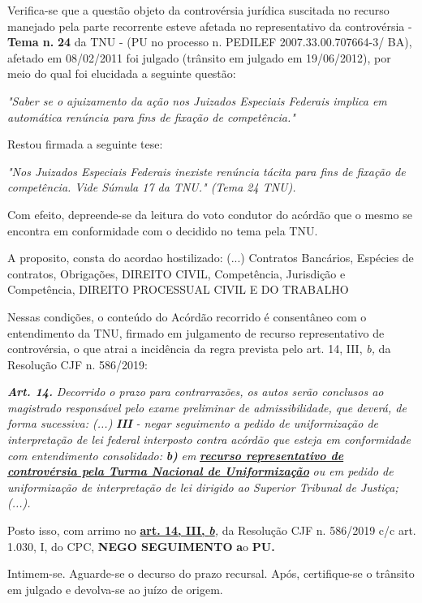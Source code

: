 \documentclass[12pt]{article}
\begin{document}
\justifying
\noindent Verifica-se que a questão objeto da controvérsia jurídica suscitada no recurso manejado pela parte recorrente esteve afetada no representativo da controvérsia - \textbf{Tema n. }\textbf{24} da TNU - (PU no processo n. PEDILEF 2007.33.00.707664-3/ BA),  afetado em 08/02/2011 foi julgado (trânsito em julgado em 19/06/2012), por meio do qual foi elucidada a seguinte questão:

\noindent \textit{"Saber se o ajuizamento da ação nos Juizados Especiais Federais implica em automática renúncia para fins de fixação de competência."}

\noindent Restou firmada a seguinte tese:

\noindent \textit{"Nos Juizados Especiais Federais inexiste renúncia tácita para fins de fixação de competência. Vide Súmula 17 da TNU." (Tema 24 TNU).}

\noindent Com efeito, depreende-se da leitura do voto condutor do acórdão que o mesmo se encontra em conformidade com o decidido no  tema pela TNU.

\noindent A proposito, consta do acordao hostilizado: (...) Contratos Bancários, Espécies de contratos, Obrigações, DIREITO CIVIL, Competência, Jurisdição e Competência, DIREITO PROCESSUAL CIVIL E DO TRABALHO

\noindent Nessas condições, o conteúdo do Acórdão recorrido é consentâneo com o entendimento da TNU, firmado em julgamento de recurso representativo de controvérsia, o que atrai a incidência da regra prevista pelo art. 14, III, \textit{b,} da Resolução CJF n. 586/2019:

\noindent \textit{\textbf{Art. 14.}}\textit{ Decorrido o prazo para contrarrazões, os autos serão conclusos ao magistrado responsável pelo exame preliminar de admissibilidade, que deverá, de forma sucessiva: (...) }\textit{\textbf{III }}\textit{- negar seguimento a pedido de uniformização de interpretação de lei federal interposto contra acórdão que esteja em conformidade com entendimento consolidado: }\textit{\textbf{b)}}\textit{ em }\uline{\textit{\textbf{recurso representativo de controvérsia pela Turma Nacional de Uniformização}}}\textit{ ou em pedido de uniformização de interpretação de lei dirigido ao Superior Tribunal de Justiça;(...).}

\noindent Posto isso, com arrimo no \uline{\textbf{art. 14, III, }}\uline{\textit{\textbf{b}}}\textit{,} da Resolução CJF n. 586/2019 c/c art. 1.030, I, do CPC, \textbf{NEGO SEGUIMENTO }\textbf{a}o\textbf{ PU}\textbf{.}

\noindent Intimem-se. Aguarde-se o decurso do prazo recursal. Após, certifique-se o trânsito em julgado e devolva-se ao juízo de origem.
\end{document}
